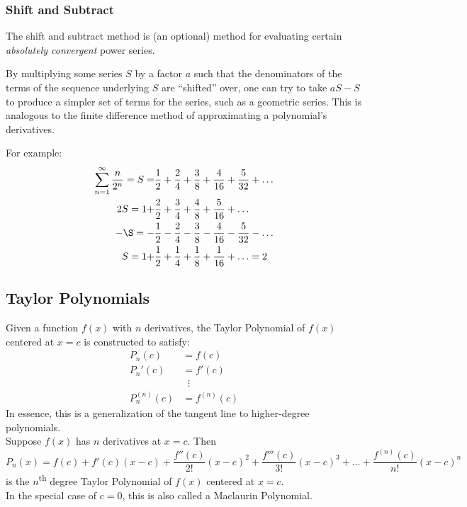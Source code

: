 \documentclass{article}
\begin{document}
\subsubsection{Shift and Subtract}
The shift and subtract method is (an optional) method for evaluating certain \emph{absolutely convergent} power series.

By multiplying some series $S$ by a factor $a$ such that the denominators of the terms of the sequence underlying $S$ are ``shifted'' over, one can try to take $aS - S$ to produce a simpler set of terms for the series, such as a geometric series. This is analogous to the finite difference method of approximating a polynomial's derivatives.

For example:
\begin{align*}
    \sum_{n=1}^\infty \frac{n}{2^n} = S = &\frac{1}{2} + \frac{2}{4} + \frac{3}{8} + \frac{4}{16} + \frac{5}{32} + \ldots \\
    2S = 1 + &\frac{2}{2} + \frac{3}{4} + \frac{4}{8} + \frac{5}{16} + \ldots \\
    -\S = -&\frac{1}{2} - \frac{2}{4} - \frac{3}{8} - \frac{4}{16} - \frac{5}{32} - \ldots  \\
    S = 1 + &\frac{1}{2} + \frac{1}{4} + \frac{1}{8} + \frac{1}{16} + \ldots = 2
\end{align*}

\subsection{Taylor Polynomials}
Given a function $f(x)$ with $n$ derivatives, the Taylor Polynomial of $f(x)$ centered at $x=c$ is constructed to satisfy:
\begin{align*}
    P_n(c)&=f(c)\\
    P_n'(c)&=f'(c)\\
    &\;\;\vdots\\
    P_n^{(n)}(c)&=f^{(n)}(c)
\end{align*}
In essence, this is a generalization of the tangent line to higher-degree polynomials.\\
Suppose $f(x)$ has $n$ derivatives at $x=c$. Then
$$P_n(x)=f(c)+f'(c)\left(x-c\right)+\frac{f''(c)}{2!}\left(x-c\right)^2+\frac{f'''(c)}{3!}\left(x-c\right)^3+\ldots+\frac{f^{(n)}(c)}{n!}\left(x-c\right)^n$$
is the $n$\textsuperscript{th} degree Taylor Polynomial of $f(x)$ centered at $x=c$.\\
In the special case of $c=0$, this is also called a Maclaurin Polynomial.
\end{document}
